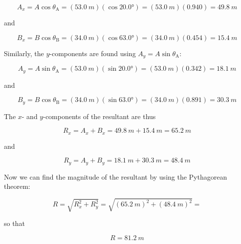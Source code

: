 \documentclass[../../main-ap-physics.tex]{subfiles}
\begin{document}
\begin{equation*}
    A_x = A \cos{\theta_{\text{A}}} = \left(\SI{53.0}{m}\right) \left(\cos{\ang{20.0}}\right) = \left(\SI{53.0}{m}\right) \left(0.940\right) = \SI{49.8}{m}
\end{equation*}

and

\begin{equation*}
    B_x = B\cos{\theta_{\text{B}}} = \left(\SI{34.0}{m}\right) \left(\cos{\ang{63.0}}\right) = \left(\SI{34.0}{m}\right) \left(0.454\right) = \SI{15.4}{m}
\end{equation*}

Similarly, the $y$-components are found using $A_y = A \sin{\theta_{\text{A}}}$:

\begin{equation*}
    A_y = A \sin{\theta_{\text{A}}} = \left(\SI{53.0}{m}\right) \left(\sin{\ang{20.0}}\right) = \left(\SI{53.0}{m}\right) \left(0.342\right) = \SI{18.1}{m}
\end{equation*}

and

\begin{equation*}
    B_y = B\cos{\theta_{\text{B}}} = \left(\SI{34.0}{m}\right) \left(\sin{\ang{63.0}}\right) = \left(\SI{34.0}{m}\right) \left(0.891\right) = \SI{30.3}{m}
\end{equation*}

The $x$- and $y$-components of the resultant are thus

\begin{equation*}
    R_x = A_x + B_x = \SI{49.8}{m} + \SI{15.4}{m} = \SI{65.2}{m}
\end{equation*}

and 

\begin{equation*}
    R_y = A_y + B_y = \SI{18.1}{m} + \SI{30.3}{m} = \SI{48.4}{m}
\end{equation*}

Now we can find the magnitude of the resultant by using the Pythagorean theorem:

\begin{equation*}
    R = \sqrt{R_x^2 + R_y^2} = \sqrt{\left(\SI{65.2}{m}\right)^2 + \left(\SI{48.4}{m}\right)^2} = 
\end{equation*}

so that 

\begin{equation*}
    R = \SI{81.2}{m}
\end{equation*}
\end{document}
